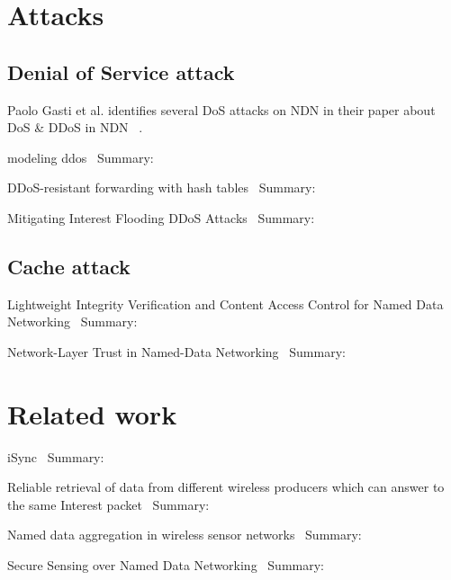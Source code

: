 \section{Attacks}

\subsection{Denial of Service attack}
Paolo Gasti et al. identifies several \gls{DoS} attacks on \gls{NDN} in their paper about \gls{DoS} \& \gls{DDoS} in \gls{NDN} ~\cite{DBLP:conf/icccn/GastiTU013}. 


modeling ddos~\cite{DBLP:journals/ijcomsys/WangCZQZ14}
Summary:


DDoS-resistant forwarding with hash tables~\cite{DBLP:conf/ancs/SoNO13}
Summary:


Mitigating Interest Flooding DDoS Attacks~\cite{DBLP:journals/corr/abs-1303-4823}
Summary:

\subsection{Cache attack}

Lightweight Integrity Verification and Content Access Control for Named Data Networking~\cite{DBLP:journals/tifs/LiZZSF15}
Summary:


Network-Layer Trust in Named-Data Networking~\cite{DBLP:journals/ccr/GhaliTU14}
Summary:


\section{Related work}
iSync~\cite{DBLP:conf/acmicn/FuAC14}
Summary:


Reliable retrieval of data from different wireless producers which can answer to the same Interest packet~\cite{DBLP:conf/acmicn/AmadeoCM14}
Summary:


Named data aggregation in wireless sensor networks~\cite{DBLP:conf/noms/AbidySLF14}
Summary:


Secure Sensing over Named Data Networking~\cite{DBLP:conf/nca/BurkeGNT14}
Summary: